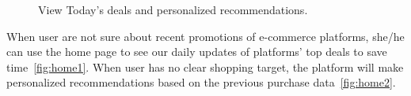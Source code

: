 \begin{figure}[t!]
	\caption{View Today's deals and personalized recommendations.}\vspace{-3ex}
	\label{fig:home}
\end{figure}
When user are not sure about recent promotions of e-commerce platforms, she/he can use the home page to see our daily updates of platforms' top deals to save time~\ref{fig:home1}. When user has no clear shopping target, the platform will make personalized recommendations based on the previous purchase data~\ref{fig:home2}.

